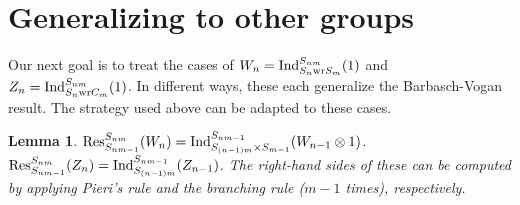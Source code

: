 \documentclass[12pt]{amsart}
\theoremstyle{plain}
\newtheorem{lemma}[theorem]{Lemma}
\theoremstyle{definition}
\theoremstyle{remark}
\newcommand{\Ind}{\textup{Ind}}
\newcommand{\Res}{\textup{Res}}
\newcommand{\wreath}{\textup{wr}}
\begin{document}
\section{Generalizing to other groups}
Our next goal is to treat the cases of $W_n = \Ind_{S_n \wreath S_m}^{S_{nm}}(1)$ and $Z_n = \Ind_{S_n \wreath C_m}^{S_{nm}}(1)$. In different ways, these each generalize the Barbasch-Vogan result. The strategy used above can be adapted to these cases.

\begin{lemma}
$\Res_{S_{nm-1}}^{S_{nm}}(W_n) = \Ind_{S_{(n-1)m} \times S_{m-1}}^{S_{nm-1}}(W_{n-1} \otimes 1)$.
$\Res_{S_{nm-1}}^{S_{nm}}(Z_n) = \Ind_{S_{(n-1)m} }^{S_{nm-1}}(Z_{n-1})$. 
The right-hand sides of these can be computed by applying Pieri's rule and the branching rule ($m-1$ times), respectively.
\end{lemma}
\end{document}
